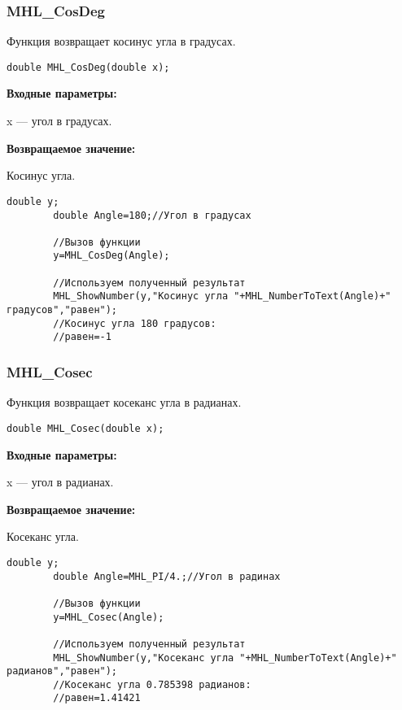 \documentclass[a4paper,12pt]{article}
\begin{document}
\subsubsection{MHL\_CosDeg}\label{MHL_CosDeg}

Функция возвращает косинус угла в градусах.


\begin{lstlisting}[label=code_syntax_MHL_CosDeg,caption=Синтаксис]
double MHL_CosDeg(double x);
\end{lstlisting}

\textbf{Входные параметры:}

 x --- угол в градусах.

\textbf{Возвращаемое значение:}

Косинус угла.


\begin{lstlisting}[label=code_use_MHL_CosDeg,caption=Пример использования]
        double y;
        double Angle=180;//Угол в градусах

        //Вызов функции
        y=MHL_CosDeg(Angle);

        //Используем полученный результат
        MHL_ShowNumber(y,"Косинус угла "+MHL_NumberToText(Angle)+" градусов","равен");
        //Косинус угла 180 градусов:
        //равен=-1
\end{lstlisting}

\subsubsection{MHL\_Cosec}\label{MHL_Cosec}

Функция возвращает косеканс угла в радианах.


\begin{lstlisting}[label=code_syntax_MHL_Cosec,caption=Синтаксис]
double MHL_Cosec(double x);
\end{lstlisting}

\textbf{Входные параметры:}

 x --- угол в радианах.

\textbf{Возвращаемое значение:}

Косеканс угла.


\begin{lstlisting}[label=code_use_MHL_Cosec,caption=Пример использования]
        double y;
        double Angle=MHL_PI/4.;//Угол в радинах

        //Вызов функции
        y=MHL_Cosec(Angle);

        //Используем полученный результат
        MHL_ShowNumber(y,"Косеканс угла "+MHL_NumberToText(Angle)+" радианов","равен");
        //Косеканс угла 0.785398 радианов:
        //равен=1.41421
\end{lstlisting}
\end{document}
